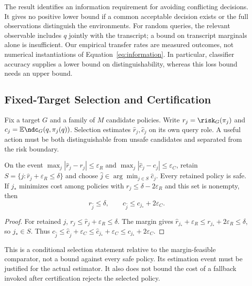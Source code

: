 The result identifies an information requirement for avoiding conflicting decisions. It gives no positive lower bound if a common acceptable decision exists or the full observations distinguish the environments. For random queries, the relevant observable includes $q$ jointly with the transcript; a bound on transcript marginals alone is insufficient. Our empirical transfer rates are measured outcomes, not numerical instantiations of Equation~\eqref{eq:information}. In particular, classifier accuracy supplies a lower bound on distinguishability, whereas this loss bound needs an upper bound.

\subsection{Fixed-Target Selection and Certification}
\label{sec:fixed-cert}

Fix a target $G$ and a family of $M$ candidate policies. Write $r_j=\risk_G(\pi_j)$ and $c_j=\mathbb{E}\ndc_G(q,\pi_j(q))$. Selection estimates $\hat r_j,\hat c_j$ on its own query role. A useful action must be both distinguishable from unsafe candidates and separated from the risk boundary.

\begin{proposition}
\label{prop:selection}
On the event $\max_j|\hat r_j-r_j|\le\varepsilon_R$ and $\max_j|\hat c_j-c_j|\le\varepsilon_C$, retain $S=\{j:\hat r_j+\varepsilon_R\le\delta\}$ and choose $\hat j\in\arg\min_{j\in S}\hat c_j$. Every retained policy is safe. If $j_*$ minimizes cost among policies with $r_j\le\delta-2\varepsilon_R$ and this set is nonempty, then
\begin{equation}
 r_{\hat j}\le\delta,\qquad c_{\hat j}\le c_{j_*}+2\varepsilon_C.
 \label{eq:selection}
\end{equation}
\end{proposition}
\begin{proof}
For retained $j$, $r_j\le\hat r_j+\varepsilon_R\le\delta$. The margin gives $\hat r_{j_*}+\varepsilon_R\le r_{j_*}+2\varepsilon_R\le\delta$, so $j_*\in S$. Thus $c_{\hat j}\le\hat c_{\hat j}+\varepsilon_C\le\hat c_{j_*}+\varepsilon_C\le c_{j_*}+2\varepsilon_C$.
\end{proof}

This is a conditional selection statement relative to the margin-feasible comparator, not a bound against every safe policy. Its estimation event must be justified for the actual estimator. It also does not bound the cost of a fallback invoked after certification rejects the selected policy.


